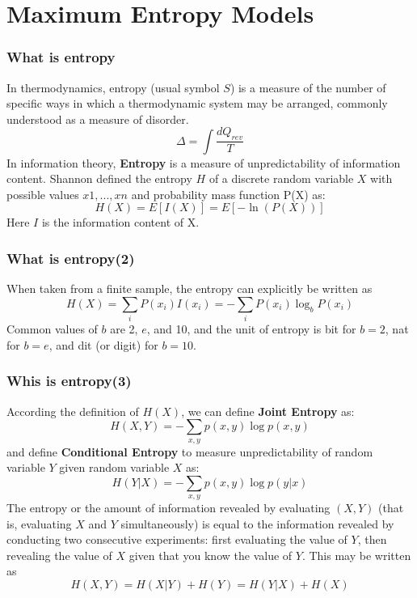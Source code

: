 \documentclass[slidestop,compress,mathserif]{beamer}
\begin{document}
	\section{Maximum Entropy Models}
	\begin{frame}
		\frametitle{What is entropy}
		In thermodynamics, entropy (usual symbol $S$) is a measure of the number of specific ways in which a thermodynamic system may be arranged, commonly understood as a measure of disorder.
		$$\Delta = \int\frac{dQ_{rev}}{T}$$
		In information theory, \textbf{Entropy} is a measure of unpredictability of information content. Shannon defined the entropy $H$ of a discrete random variable $X$ with possible values $x1, ..., xn$ and probability mass function P(X) as:
		$$H(X) = E[I(X)] = E[-\ln(P(X))]$$
		Here $I$ is the information content of X.
		
	\end{frame}
	
	\begin{frame}
		\frametitle{What is entropy(2)}
		When taken from a finite sample, the entropy can explicitly be written as
		$$H(X) = \sum_i P(x_i)I(x_i) = -\sum_i P(x_i)\log_b P(x_i)$$
		Common values of $b$ are 2, $e$, and 10, and the unit of entropy is bit for $b = 2$, nat for $b = e$, and dit (or digit) for $b = 10$.
		\begin{figure}
		\end{figure}
		
	\end{frame}
	
	\begin{frame}[shrink]
		\frametitle{Whis is entropy(3)}
		According the definition of $H(X)$, we can define \textbf{Joint Entropy} as:
		$$H(X,Y) = -\sum_{x,y}p(x,y)\log p(x,y)$$
		and  define \textbf{Conditional Entropy} to measure unpredictability of random variable $Y$ given random variable $X$ as:
		$$H(Y|X) = -\sum_{x,y} p(x,y)\log p(y|x)$$
		The entropy or the amount of information revealed by evaluating $(X,Y)$ (that is, evaluating $X$ and $Y$ simultaneously) is equal to the information revealed by conducting two consecutive experiments: first evaluating the value of $Y$, then revealing the value of $X$ given that you know the value of $Y$. This may be written as
		\begin{equation}
			H(X,Y) = H(X|Y)+H(Y)=H(Y|X)+H(X)
		\end{equation}	
	\end{frame}
	
\end{document}
